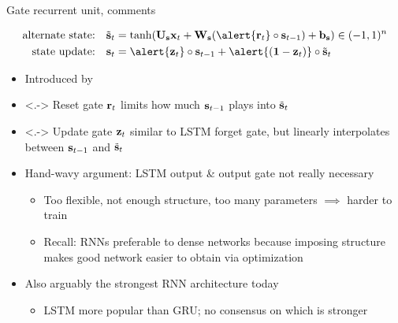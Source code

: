 \begin{frame}{Gate recurrent unit, comments}
    \begin{block}{}
        \vspace{-5mm}
        \begin{align*}
            \text{alternate state:} \quad \st_t &= \tanh(\U_\s \x_t + \W_\s (\alert{\r_t} \circ \s_{t-1}) + \b_\s) \in (-1, 1)^n \\
            \text{state update:} \quad \s_t &= \alert{\z_t} \circ \s_{t-1} + \alert{(\one - \z_t)} \circ \st_t
        \end{align*}
    \end{block}

    \begin{itemize}
        \item<+-> Introduced by \citet{ChoEMNLP14}
        \item<.-> \alert{Reset gate $\mathbf{r}_t$} limits how much $\mathbf{s}_{t-1}$ plays into $\tilde{\mathbf{s}}_t$
        \item<.-> \alert{Update gate $\mathbf{z}_t$} similar to LSTM forget gate, but linearly interpolates between $\mathbf{s}_{t-1}$ and $\tilde{\mathbf{s}}_t$
        \item<+-> Hand-wavy argument: LSTM output \& output gate not really necessary
        \begin{itemize}
            \item Too flexible, not enough structure, too many parameters $\implies$ harder to train
            \item Recall: RNNs preferable to dense networks because imposing structure makes good network easier to obtain via optimization
        \end{itemize}
        \item<+-> Also arguably the strongest RNN architecture today \citep{JozefowiczICML15}
        \begin{itemize}
            \item LSTM more popular than GRU; no consensus on which is stronger
        \end{itemize}
    \end{itemize}
\end{frame}


